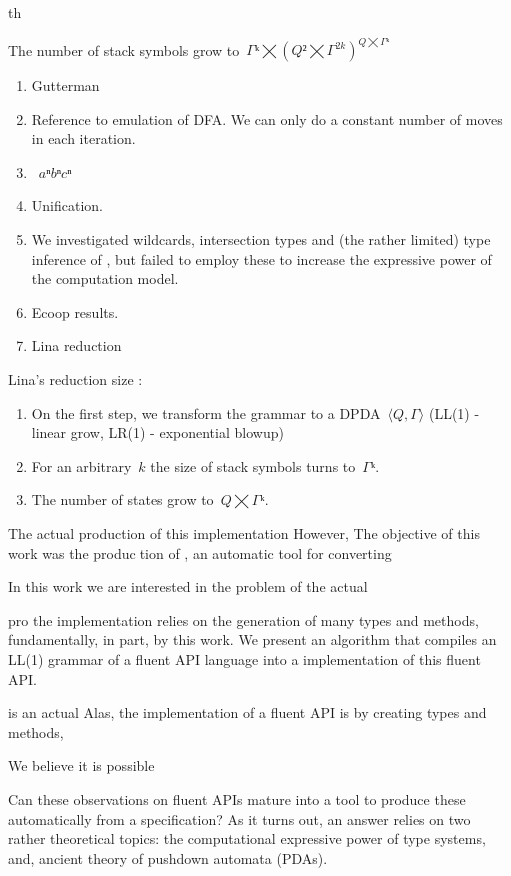   
  th
  \item The number of stack symbols grow to~$Γᵏ⨉(Q²⨉Γ^{2k})^{Q⨉Γᵏ}$
  
  \begin{enumerate}
  \item Gutterman
  \item Reference to emulation of DFA\@. We can only do
        a constant number of moves in each iteration.
        \item~$aⁿbⁿcⁿ$
  \item \Prolog Unification.
  \item We investigated wildcards, intersection types and
        (the rather limited) type inference of
        \Java, but failed to employ these to increase the expressive power of
        the computation model.  
      \item Ecoop results.
  \item Lina reduction
\end{enumerate}

Lina's reduction size :
\begin{enumerate}
  \item On the first step, we transform the grammar to a DPDA~$⟨Q,Γ⟩$ (LL(1) -
    linear grow, LR(1) - exponential blowup)
  \item For an arbitrary~$k$ the size of stack symbols turns to~$Γᵏ$.
  \item The number of states grow to~$Q⨉Γᵏ$.
\end{enumerate}



The actual production of this implementation
However, 
The objective of this work was the production of \Fajita, an automatic tool for
converting 

In this work we are interested in the problem of the actual 


pro
the implementation relies on the generation of many types and methods, fundamentally,  
in part, by this 
  work.
We present an algorithm that compiles an LL(1) grammar of a fluent API language
  into a \Java implementation of this fluent API.

\Fajita is an actual  
Alas, the implementation of a fluent API is by creating
  types and methods, 

We believe it is possible

Can these observations on fluent APIs mature into
  a tool to produce these automatically from a specification?
As it turns out, an answer relies on
  two rather theoretical topics:
  the computational expressive power of type systems,
  and, ancient theory of pushdown automata (PDAs).

